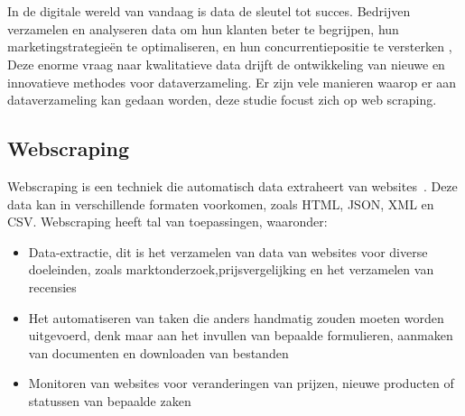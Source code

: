 \chapter{}%
\label{ch:stand-van-zaken}


In de digitale wereld van vandaag is data de sleutel tot succes. Bedrijven verzamelen en analyseren data om hun klanten beter te begrijpen, hun marketingstrategieën te optimaliseren, en hun concurrentiepositie te versterken \autocite{OnesiOzigagun2024},
Deze enorme vraag naar kwalitatieve data drijft de ontwikkeling van nieuwe en innovatieve methodes voor dataverzameling. Er zijn vele manieren waarop er aan dataverzameling kan gedaan worden, deze studie focust zich op web scraping.

\section{Webscraping}
Webscraping is een techniek die automatisch data extraheert van websites~\autocite{Khder2021}. Deze data kan in verschillende formaten voorkomen, zoals HTML, JSON, XML en CSV. Webscraping heeft tal van toepassingen, waaronder:
\begin{itemize}
    \item Data-extractie, dit is het verzamelen van data van websites voor diverse doeleinden,
    zoals marktonderzoek,prijsvergelijking en het verzamelen van recensies
    \item Het automatiseren van taken die anders handmatig zouden moeten worden uitgevoerd, denk maar
    aan het invullen van bepaalde formulieren, aanmaken van documenten en downloaden van bestanden
    \item Monitoren van websites voor veranderingen van prijzen, nieuwe producten of statussen van bepaalde zaken
\end{itemize}


